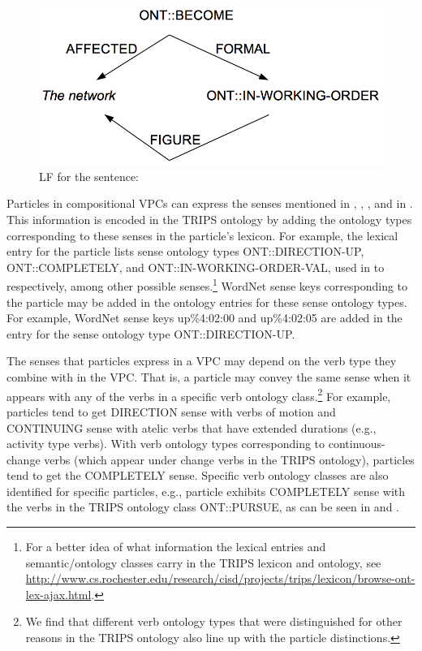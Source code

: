 \documentclass[output=paper
,modfonts
,nonflat]{langsci/langscibook}
\begin{document}
\begin{figure}[!t]
\includegraphics[scale=0.6]{figures/LF3_uppercase}
\caption{LF for the sentence: }\label{fig:lf3}
\end{figure}


Particles in compositional VPCs can express the senses mentioned in , , , and in . This information is encoded in the TRIPS ontology by adding the ontology types corresponding to these senses in the particle's lexicon. For example, the lexical entry for the particle  lists sense ontology types ONT::DIRECTION-UP, ONT::COMPLETELY, and ONT::IN-WORKING-ORDER-VAL, used in  to  respectively, among other possible senses.\footnote{For a better idea of what information the lexical entries and semantic/ontology classes carry in the TRIPS lexicon and ontology, see  \url{http://www.cs.rochester.edu/research/cisd/projects/trips/lexicon/browse-ont-lex-ajax.html}.} WordNet sense keys corresponding to the particle may be added in the ontology entries for these sense ontology types. For example, WordNet sense keys up\%4:02:00 and up\%4:02:05 are added in the entry for the sense ontology type ONT::DIRECTION-UP.

The senses that particles express in a VPC may depend on the verb type they combine with in the VPC. That is, a particle may convey the same sense when it appears with any of the verbs in a specific verb ontology class.\footnote{We find that different verb ontology types that were distinguished for other reasons in the TRIPS  ontology \citep{All07} also line up with the particle distinctions.} For example, particles tend to get DIRECTION sense with verbs of motion and CONTINUING sense with atelic verbs that have extended durations (e.g., activity type verbs). With verb ontology types corresponding to continuous-change verbs (which appear under change verbs in the TRIPS ontology), particles tend to get the COMPLETELY sense. Specific verb ontology classes are also identified for specific particles, e.g., particle  exhibits COMPLETELY sense with the verbs in the TRIPS ontology class ONT::PURSUE, as can be seen in 
and .
\end{document}
